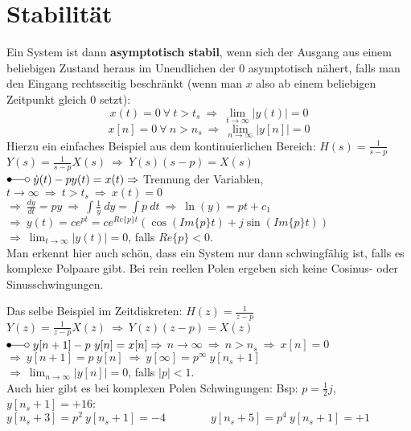 \documentclass[a4paper,11pt]{article}
\begin{document}
\section*{Stabilität \large}
Ein System ist dann \textbf{asymptotisch stabil}, wenn sich der Ausgang aus einem beliebigen Zustand heraus im Unendlichen der 0 asymptotisch nähert, falls man den Eingang rechtsseitig beschränkt (wenn man $x$ also ab einem beliebigen Zeitpunkt gleich 0 setzt):
$$x(t)=0\ \forall\ t>t_s\ \Rightarrow\ \displaystyle\lim_{t\to\infty}|y(t)|=0$$
$$x[n]=0\ \forall\ n>n_s\ \Rightarrow\ \displaystyle\lim_{n\to\infty}|y[n]|=0$$
Hierzu ein einfaches Beispiel aus dem kontinuierlichen Bereich: $H(s)=\frac{1}{s-p}$
\\$Y(s)=\frac{1}{s-p}X(s)\ \Rightarrow\ Y(s)(s-p)=X(s)$
\\$\Laplace\ \dot y(t)-py(t)=x(t) \Rightarrow$ Trennung der Variablen, $t\to\infty\ \Rightarrow\ t>t_s\ \Rightarrow\ x(t)=0$
\\$\Rightarrow\ \frac{dy}{dt}=py\ \Rightarrow\ \int \frac{1}{y}\ dy=\int p\ dt\ \Rightarrow\ \ln(y)=pt+c_1\ $
\\ $\Rightarrow\ y(t)=ce^{pt}=ce^{Re\{p\}t}\left(\cos(Im\{p\}t)+j\sin(Im\{p\}t)\right)$
\\ $\Rightarrow\ \displaystyle\lim_{t\to\infty}|y(t)|=0$, falls $Re\{p\}<0$.
\vspace{.3cm}
\\Man erkennt hier auch schön, dass ein System nur dann schwingfähig ist, falls es komplexe Polpaare gibt. Bei rein reellen Polen ergeben sich keine Cosinus- oder Sinusschwingungen.

\vspace{0.4cm}Das selbe Beispiel im Zeitdiskreten: $H(z)=\frac{1}{z-p}$
\\$Y(z)=\frac{1}{z-p}X(z)\ \Rightarrow\ Y(z)(z-p)=X(z)$
\\$\Laplace\ y[n+1]-p\ y[n]=x[n] \Rightarrow$ $n\to\infty\ \Rightarrow\ n>n_s\ \Rightarrow\ x[n]=0$ 
\\$\Rightarrow\ y[n+1]=p\ y[n]\ \Rightarrow\  $\glqq$y[\infty]=p^{\infty}\ y[n_s+1]$\grqq
\\$\Rightarrow\ \displaystyle\lim_{n\to\infty}|y[n]|=0$, falls $|p|<1$.
\vspace{.3cm}
\\Auch hier gibt es bei komplexen Polen Schwingungen: Bsp: $p=\frac{1}{2}j$, $y[n_s+1]=+16$:
$y[n_s+3]=p^2\ y[n_s+1]=-4 \qquad\qquad y[n_s+5]=p^4\ y[n_s+1]=+1$

\end{document}
